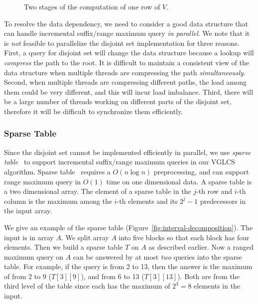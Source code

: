 \begin{figure}[!thb]
  \centering {} 
  \caption{Two stages of the computation of one row of $V$.}
  \label{fig:fig-VGLCS-dp-rmq}
\end{figure}

To resolve the data dependency, we need to consider a good data
structure that can handle incremental suffix/range maximum query {\em in
parallel}.  We note that it is {\em not} feasible to parallelize the
disjoint set implementation for three reasons.  First, a query for
disjoint set will change the data structure because a lookup will {\em
compress} the path to the root.  It is difficult to maintain a
consistent view of the data structure when multiple threads are
compressing the path {\em simultaneously}.  Second, when multiple
threads are compressing different paths, the load among them could be
very different, and this will incur load imbalance.  Third, there will
be a large number of threads working on different parts of the disjoint
set, therefore it will be difficult to synchronize them efficiently.

\subsubsection{Sparse Table} \label{sec:sparse-table}

Since the disjoint set cannot be implemented efficiently in parallel,
we use {\em sparse table}~\cite{Berkman1993RecursiveSP} to support
incremental suffix/range maximum queries in our VGLCS algorithm.
Sparse table~\cite{Berkman1993RecursiveSP} requires a $O(n \log n)$
preprocessing, and can support range maximum query in $O(1)$ time on
one dimensional data.  A sparse table is a two dimensional array.  The
element of a sparse table in the $j$-th row and $i$-th column is the
maximum among the $i$-th elements and its $2^j - 1$ predecessors in
the input array.

We give an example of the sparse table
(Figure~\ref{fig:interval-decomposition}).  The input is in array $A$.
We split array $A$ into five blocks so that each block has four
elements.  Then we build a sparse table $T$ on $A$ as described
earlier.  Now a ranged maximum query on $A$ can be answered by at most
{\em two} queries into the sparse table.  For example, if the query is
from 2 to 13, then the answer is the maximum of from 2 to 9
($T[3][9]$), and from 6 to 13 ($T[3][13]$).  Both are from the third
level of the table since each has the maximum of $2^3 = 8$ elements in
the input.

